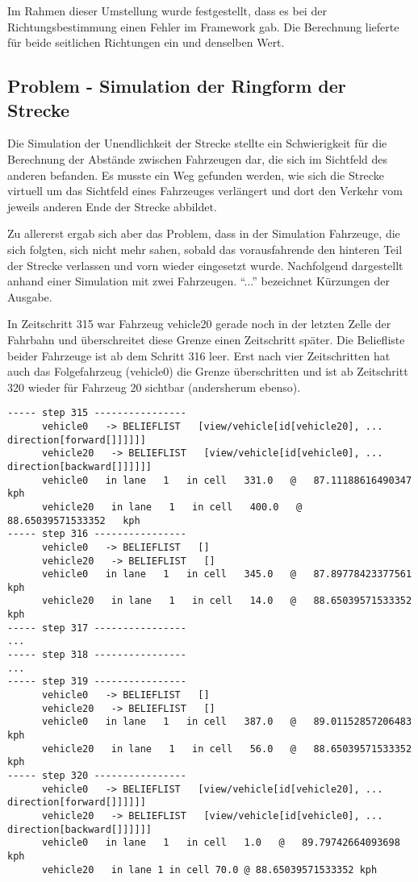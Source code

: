 Im Rahmen dieser Umstellung wurde festgestellt, dass es bei der Richtungsbestimmung einen Fehler im Framework gab.
Die Berechnung lieferte für beide seitlichen Richtungen ein und denselben Wert.



\subsection{Problem - Simulation der Ringform der Strecke}

Die Simulation der Unendlichkeit der Strecke stellte ein Schwierigkeit für die Berechnung der Abstände zwischen Fahrzeugen dar, die sich im Sichtfeld des anderen befanden.
Es musste ein Weg gefunden werden, wie sich die Strecke virtuell um das Sichtfeld eines Fahrzeuges verlängert und dort den Verkehr vom jeweils anderen Ende der Strecke abbildet.

Zu allererst ergab sich aber das Problem, dass in der Simulation Fahrzeuge, die sich folgten, sich nicht mehr sahen, sobald das vorausfahrende den hinteren Teil der Strecke verlassen und vorn wieder eingesetzt wurde.
Nachfolgend dargestellt anhand einer Simulation mit zwei Fahrzeugen.
\enquote{...} bezeichnet Kürzungen der Ausgabe.

In Zeitschritt 315 war Fahrzeug vehicle20 gerade noch in der letzten Zelle der Fahrbahn und überschreitet diese Grenze einen Zeitschritt später.
Die Beliefliste beider Fahrzeuge ist ab dem Schritt 316 leer.
Erst nach vier Zeitschritten hat auch das Folgefahrzeug (vehicle0) die Grenze überschritten und ist ab Zeitschritt 320 wieder für Fahrzeug 20 sichtbar (andersherum ebenso).

\footnotesize\begin{verbatim}
----- step 315 ----------------
      vehicle0   -> BELIEFLIST   [view/vehicle[id[vehicle20], ... direction[forward[]]]]]]
      vehicle20   -> BELIEFLIST   [view/vehicle[id[vehicle0], ... direction[backward[]]]]]]
      vehicle0   in lane   1   in cell   331.0   @   87.11188616490347   kph
      vehicle20   in lane   1   in cell   400.0   @   88.65039571533352   kph
----- step 316 ----------------
      vehicle0   -> BELIEFLIST   []
      vehicle20   -> BELIEFLIST   []
      vehicle0   in lane   1   in cell   345.0   @   87.89778423377561   kph
      vehicle20   in lane   1   in cell   14.0   @   88.65039571533352   kph
----- step 317 ----------------
...
----- step 318 ----------------
...
----- step 319 ----------------
      vehicle0   -> BELIEFLIST   []
      vehicle20   -> BELIEFLIST   []
      vehicle0   in lane   1   in cell   387.0   @   89.01152857206483   kph
      vehicle20   in lane   1   in cell   56.0   @   88.65039571533352   kph
----- step 320 ----------------
      vehicle0   -> BELIEFLIST   [view/vehicle[id[vehicle20], ... direction[forward[]]]]]]
      vehicle20   -> BELIEFLIST   [view/vehicle[id[vehicle0], ... direction[backward[]]]]]]
      vehicle0   in lane   1   in cell   1.0   @   89.79742664093698   kph
      vehicle20   in lane 1 in cell 70.0 @ 88.65039571533352 kph
\end{verbatim}
\normalsize

